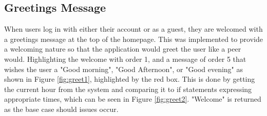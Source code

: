 \documentclass{l4proj}
\begin{document}
\subsection{Greetings Message}
When users log in with either their account or as a guest,  they are welcomed with a greetings message at the top of the homepage. This was implemented to provide a welcoming nature so that the application would greet the user like a peer would. Highlighting the welcome with order 1,  and a message of order 5 that wishes the user a "Good morning",  "Good Afternoon",  or "Good evening" as shown in Figure \ref{fig:greet1},  highlighted by the red box. This is done by getting the current hour from the system and comparing it to if statements expressing appropriate times,  which can be seen in Figure \ref{fig:greet2}. "Welcome" is returned as the base case should issues occur.
\end{document}
